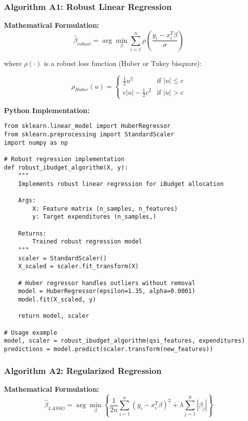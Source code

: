 \subsubsection{Algorithm A1: Robust Linear Regression}

\textbf{Mathematical Formulation:}
\begin{equation}
\hat{\beta}_{robust} = \arg\min_{\beta} \sum_{i=1}^{n} \rho\left(\frac{y_i - x_i^T\beta}{\sigma}\right)
\end{equation}

where $\rho(\cdot)$ is a robust loss function (Huber or Tukey bisquare):

\begin{equation}
\rho_{Huber}(u) = \begin{cases}
\frac{1}{2}u^2 & \text{if } |u| \leq c \\
c|u| - \frac{1}{2}c^2 & \text{if } |u| > c
\end{cases}
\end{equation}

\textbf{Python Implementation:}
\begin{lstlisting}
from sklearn.linear_model import HuberRegressor
from sklearn.preprocessing import StandardScaler
import numpy as np

# Robust regression implementation
def robust_ibudget_algorithm(X, y):
    """
    Implements robust linear regression for iBudget allocation
    
    Args:
        X: Feature matrix (n_samples, n_features)
        y: Target expenditures (n_samples,)
    
    Returns:
        Trained robust regression model
    """
    scaler = StandardScaler()
    X_scaled = scaler.fit_transform(X)
    
    # Huber regressor handles outliers without removal
    model = HuberRegressor(epsilon=1.35, alpha=0.0001)
    model.fit(X_scaled, y)
    
    return model, scaler

# Usage example
model, scaler = robust_ibudget_algorithm(qsi_features, expenditures)
predictions = model.predict(scaler.transform(new_features))
\end{lstlisting}

\subsubsection{Algorithm A2: Regularized Regression}

\textbf{Mathematical Formulation:}
\begin{equation}
\hat{\beta}_{LASSO} = \arg\min_{\beta} \left\{\frac{1}{2n}\sum_{i=1}^{n}(y_i - x_i^T\beta)^2 + \lambda\sum_{j=1}^{p}|\beta_j|\right\}
\end{equation}

